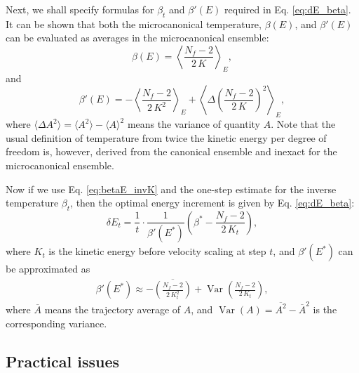\documentclass[reprint]{revtex4-1}
\begin{document}
Next, we shall specify formulas for $\beta_t$
and $\beta'(E)$ required in Eq. \eqref{eq:dE_beta}.
%
It can be shown that both the microcanonical temperature, $\beta(E)$,
and $\beta'(E)$ can be evaluated as
averages in the microcanonical ensemble\cite{rugh1997}:
%
\begin{equation}
  \beta(E)
  =
  \left\langle
    \frac{ N_f - 2 }
         { 2 \, K }
  \right\rangle_E
  ,
  \label{eq:betaE_invK}
\end{equation}
%
and
%
\begin{equation}
  \beta'(E)
  =
  - \left\langle
      \frac{ N_f - 2 }
           { 2 \, K^2 }
    \right\rangle_E
  + \left\langle
      \Delta\left(
        \frac{ N_f - 2 }
             { 2 \, K }
      \right)^2
    \right\rangle_E
  ,
  \label{eq:dbetadE}
\end{equation}
%
where
$\langle \Delta A^2 \rangle = \langle A^2 \rangle - \langle A \rangle^2$
means the variance of quantity $A$.
%
Note that the usual definition of temperature from twice the kinetic energy
per degree of freedom is, however,
derived from the canonical ensemble and
inexact for the microcanonical ensemble.



Now if we use Eq. \eqref{eq:betaE_invK} and
the one-step estimate for the inverse temperature
$\beta_t$,
then the optimal energy increment is given by
Eq. \eqref{eq:dE_beta}:
%
\begin{equation}
\delta E_t
=
\frac{ 1 } { t } \cdot
\frac{ 1 } { \beta'(E^*) }
\left(
 \beta^* -
 \frac{ N_f - 2  }
      { 2 \, K_t }
\right)
,
\label{eq:dE_final}
\end{equation}
%
where
$K_t$ is the kinetic energy before velocity scaling at step $t$,
and $\beta'(E^*)$ can be approximated
as
%
\begin{align}
  \beta'(E^*)
  \approx
  - \overline{
    \left(
      \frac{ N_f - 2 }
           { 2 \, K_t^2 }
    \right)
    }
    +
    \operatorname{Var}
    \left(
        \frac{ N_f - 2 }
             { 2 \, K_t }
    \right)
  ,
  \label{eq:dbeta}
\end{align}
%
where
$\overline A$ means the trajectory average of $A$,
and
$\operatorname{Var}(A) = \overline{ A^2 } - {\overline A}^2$
is the corresponding variance.
%


\subsection{Practical issues}
\end{document}
